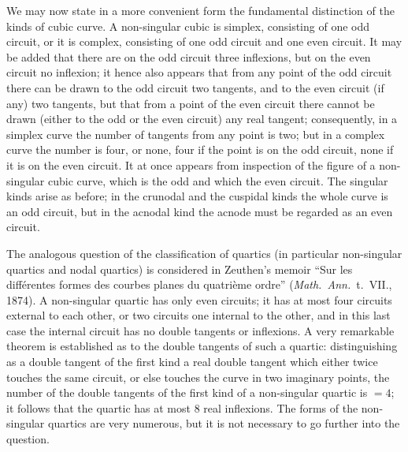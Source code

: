 \documentclass[12pt,a4paper,oneside]{book}
\begin{document}
We may now state in a more convenient form the fundamental distinction of the kinds of cubic curve. A non-singular cubic is simplex, consisting of one odd circuit, or it is complex, consisting of one odd circuit and one even circuit. It may be added that there are on the odd circuit three inflexions, but on the even circuit no inflexion; it hence also appears that from any point of the odd circuit there can be drawn to the odd circuit two tangents, and to the even circuit (if any) two tangents, but that from a point of the even circuit there cannot be drawn (either to the odd or the even circuit) any real tangent; consequently, in a simplex curve the number of tangents from any point is two; but in a complex curve the number is four, or none, four if the point is on the odd circuit, none if it is on the even circuit. It at once appears from inspection of the figure of a non-singular cubic curve, which is the odd and which the even circuit. The singular kinds arise as before; in the crunodal and the cuspidal kinds the whole curve is an odd circuit, but in the acnodal kind the acnode must be regarded as an even circuit.

The analogous question of the classification of quartics (in particular non-singular quartics and nodal quartics) is considered in Zeuthen's memoir ``Sur les diff\'erentes formes des courbes planes du quatri\`eme ordre'' (\textit{Math.\ Ann.}\ t.~VII., 1874). A non-singular quartic has only even circuits; it has at most four circuits external to each other, or two circuits one internal to the other, and in this last case the internal circuit has no double tangents or inflexions. A very remarkable theorem is established as to the double tangents of such a quartic: distinguishing as a double tangent of the first kind a real double tangent which either twice touches the same circuit, or else touches the curve in two imaginary points, the number of the double tangents of the first kind of a non-singular quartic is $=4$; it follows that the quartic has at most 8 real inflexions. The forms of the non-singular quartics are very numerous, but it is not necessary to go further into the question.
\end{document}
